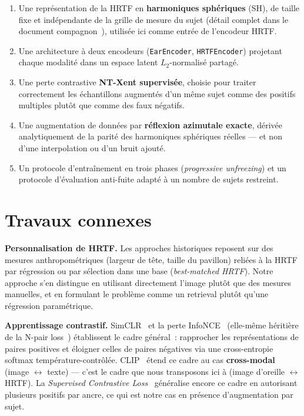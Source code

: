 \documentclass[12pt, a4paper]{article}
\begin{document}
\begin{enumerate}
    \item Une représentation de la HRTF en \textbf{harmoniques sphériques}
    (SH), de taille fixe et indépendante de la grille de mesure du sujet
    (détail complet dans le document compagnon~\cite{SHCompanion}),
    utilisée ici comme entrée de l'encodeur HRTF.
    \item Une architecture à deux encodeurs (\texttt{EarEncoder},
    \texttt{HRTFEncoder}) projetant chaque modalité dans un espace latent
    $L_2$-normalisé partagé.
    \item Une perte contrastive \textbf{NT-Xent supervisée}, choisie pour
    traiter correctement les échantillons augmentés d'un même sujet comme
    des positifs multiples plutôt que comme des faux négatifs.
    \item Une augmentation de données par \textbf{réflexion azimutale
    exacte}, dérivée analytiquement de la parité des harmoniques
    sphériques réelles — et non d'une interpolation ou d'un bruit ajouté.
    \item Un protocole d'entraînement en trois phases (\textit{progressive
    unfreezing}) et un protocole d'évaluation anti-fuite adapté à un
    nombre de sujets restreint.
\end{enumerate}

\section{Travaux connexes}

\textbf{Personnalisation de HRTF.} Les approches historiques reposent sur
des mesures anthropométriques (largeur de tête, taille du pavillon) reliées
à la HRTF par régression ou par sélection dans une base
(\textit{best-matched HRTF}). Notre approche s'en distingue en utilisant
directement l'image plutôt que des mesures manuelles, et en formulant le
problème comme un retrieval plutôt qu'une régression paramétrique.

\textbf{Apprentissage contrastif.} SimCLR~\cite{Chen19} et la perte
InfoNCE~\cite{Oord18} (elle-même héritière de la N-pair loss~\cite{Sohn16})
établissent le cadre général~: rapprocher les représentations de paires
positives et éloigner celles de paires négatives via une cross-entropie
softmax température-contrôlée. CLIP~\cite{Radford21} étend ce cadre au
cas \textbf{cross-modal} (image $\leftrightarrow$ texte) — c'est le cadre
que nous transposons ici à (image d'oreille $\leftrightarrow$ HRTF). La
\textit{Supervised Contrastive Loss}~\cite{Khosla20} généralise encore ce
cadre en autorisant plusieurs positifs par ancre, ce qui est notre cas en
présence d'augmentation par sujet.
\end{document}
